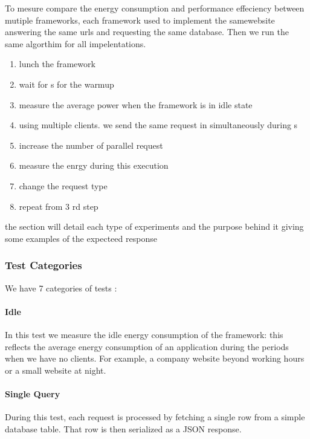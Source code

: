 To mesure compare the energy consumption and performance effeciency between mutiple frameworks, each framework used to implement the samewebsite answering the same urls and requesting the same database. Then we run the same algorthim for all impelentations.
\begin{enumerate}
    \item lunch the framework
    \item wait for \duration s for the warmup
    \item measure the average power when the framework is in idle state
    \item using multiple clients. we send the same request in simultaneously during \duration s
    \item increase the number of parallel request
    \item measure the enrgy during this execution
    \item change the request type
    \item repeat from 3 rd step
\end{enumerate}
the section will detail each type of experiments  and the purpose behind it giving some examples of the expecteed response

\subsubsection{Test Categories}
We have 7 categories of tests :

\paragraph{Idle}
In this test we measure the idle energy consumption of the framework: this reflects the average energy consumption of an application during the periods when we have no clients.
For example, a company website beyond working hours or a small website at night.


\paragraph{Single Query}
During this test, each request  is processed by fetching a single row from a simple database table. That row is then serialized as a JSON response.

